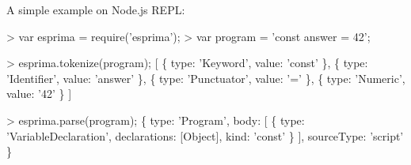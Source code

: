 A simple example on Node.\+js R\+E\+PL\+:


\begin{DoxyCode}
> var esprima = require('esprima');
> var program = 'const answer = 42';

> esprima.tokenize(program);
[ \{ type: 'Keyword', value: 'const' \},
  \{ type: 'Identifier', value: 'answer' \},
  \{ type: 'Punctuator', value: '=' \},
  \{ type: 'Numeric', value: '42' \} ]

> esprima.parse(program);
\{ type: 'Program',
  body:
   [ \{ type: 'VariableDeclaration',
       declarations: [Object],
       kind: 'const' \} ],
  sourceType: 'script' \}
\end{DoxyCode}
 
